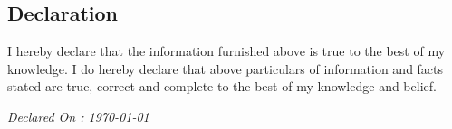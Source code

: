 \documentclass[margin,line]{res}
\begin{document}
\begin{resume}
\section{\sc Declaration }
{\sc I hereby declare that the information furnished above is true to the best of my knowledge. I do hereby declare that above particulars of information and facts stated are true, correct and complete to the best of my knowledge and belief.}



\begin{center}
{\em Declared On :  {\em \today} }
\end{center}

\end{resume}
\end{document}
